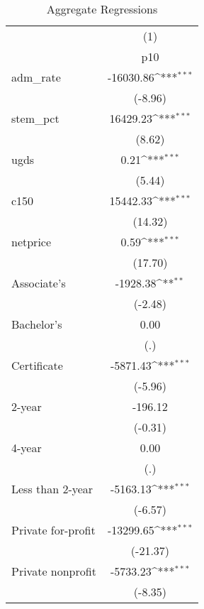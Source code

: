 \begin{table}[htbp]\centering
\def\sym#1{\ifmmode^{#1}\else\(^{#1}\)\fi}
\caption{Aggregate Regressions}
\begin{tabular}{l*{1}{c}}
\hline\hline
                    &\multicolumn{1}{c}{(1)}\\
                    &\multicolumn{1}{c}{p10}\\
\hline
adm\_rate            &   -16030.86\sym{***}\\
                    &     (-8.96)         \\
stem\_pct            &    16429.23\sym{***}\\
                    &      (8.62)         \\
ugds                &        0.21\sym{***}\\
                    &      (5.44)         \\
c150                &    15442.33\sym{***}\\
                    &     (14.32)         \\
netprice            &        0.59\sym{***}\\
                    &     (17.70)         \\
Associate's         &    -1928.38\sym{**} \\
                    &     (-2.48)         \\
Bachelor's          &        0.00         \\
                    &         (.)         \\
Certificate         &    -5871.43\sym{***}\\
                    &     (-5.96)         \\
2-year              &     -196.12         \\
                    &     (-0.31)         \\
4-year              &        0.00         \\
                    &         (.)         \\
Less than 2-year    &    -5163.13\sym{***}\\
                    &     (-6.57)         \\
Private for-profit  &   -13299.65\sym{***}\\
                    &    (-21.37)         \\
Private nonprofit   &    -5733.23\sym{***}\\
                    &     (-8.35)         \\

\end{tabular}
\end{table}
